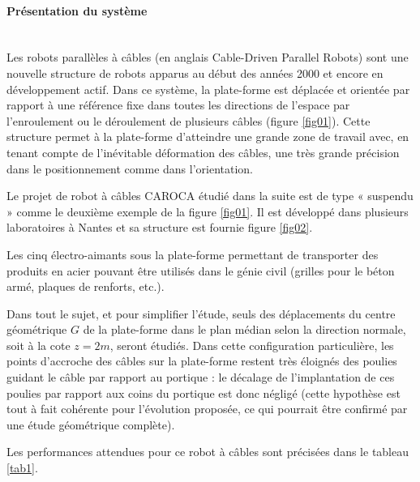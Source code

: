 

\paragraph{Présentation du système} ~\ \\

Les robots parallèles à câbles (en anglais Cable-Driven Parallel Robots) sont une nouvelle structure de robots apparus au début des années 2000 et encore en développement actif. Dans ce système, la plate-forme est déplacée et orientée par rapport à une référence fixe dans toutes les directions de l’espace par l’enroulement ou le déroulement de plusieurs câbles (figure \ref{fig01}). Cette structure permet à la plate-forme d’atteindre une grande zone de travail avec, en tenant compte de l’inévitable déformation des câbles, une très grande précision dans le positionnement comme dans l’orientation.


Le projet de robot à câbles CAROCA étudié dans la suite est de type « suspendu » comme le deuxième exemple de la figure \ref{fig01}. Il est développé dans plusieurs laboratoires à Nantes et sa structure est fournie figure \ref{fig02}.


Les cinq électro-aimants sous la plate-forme permettant de transporter des produits en acier pouvant être utilisés dans le génie civil (grilles pour le béton armé, plaques de renforts, etc.).

Dans tout le sujet, et pour simplifier l’étude, seuls des déplacements du centre géométrique $G$ de la plate-forme dans le plan médian selon la direction normale, soit à la cote $z=2m$, seront étudiés. Dans cette configuration particulière, les points d’accroche des câbles sur la plate-forme restent très éloignés des poulies guidant le câble par rapport au portique : le décalage de l’implantation de ces poulies par rapport aux coins du portique est donc négligé (cette hypothèse est tout à fait cohérente pour l’évolution proposée, ce qui pourrait être confirmé par une étude géométrique complète).

Les performances attendues pour ce robot à câbles sont précisées dans le tableau \ref{tab1}.

